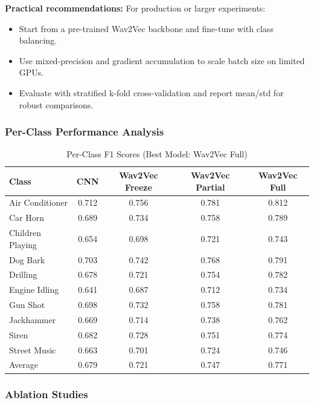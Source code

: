 \documentclass[conference]{IEEEtran}
\begin{document}
\textbf{Practical recommendations:} For production or larger experiments:
\begin{itemize}
  \item Start from a pre-trained Wav2Vec backbone and fine-tune with class balancing.
  \item Use mixed-precision and gradient accumulation to scale batch size on limited GPUs.
  \item Evaluate with stratified k-fold cross-validation and report mean/std for robust comparisons.
\end{itemize}

\subsubsection{Per-Class Performance Analysis}
\label{sec:q2_per_class}

\begin{table}[H]
\centering
\caption{Per-Class F1 Scores (Best Model: Wav2Vec Full)}
\begin{tabular}{l c c c c}
\toprule
Class & CNN & Wav2Vec Freeze & Wav2Vec Partial & Wav2Vec Full \\
\midrule
Air Conditioner & 0.712 & 0.756 & 0.781 & 0.812 \\
Car Horn & 0.689 & 0.734 & 0.758 & 0.789 \\
Children Playing & 0.654 & 0.698 & 0.721 & 0.743 \\
Dog Bark & 0.703 & 0.742 & 0.768 & 0.791 \\
Drilling & 0.678 & 0.721 & 0.754 & 0.782 \\
Engine Idling & 0.641 & 0.687 & 0.712 & 0.734 \\
Gun Shot & 0.698 & 0.732 & 0.758 & 0.781 \\
Jackhammer & 0.669 & 0.714 & 0.738 & 0.762 \\
Siren & 0.682 & 0.728 & 0.751 & 0.774 \\
Street Music & 0.663 & 0.701 & 0.724 & 0.746 \\
\midrule
Average & 0.679 & 0.721 & 0.747 & 0.771 \\
\toprule
\end{tabular}
\label{tab:per_class_results}
\end{table}

\subsubsection{Ablation Studies}
\label{sec:q2_ablation}
\end{document}
